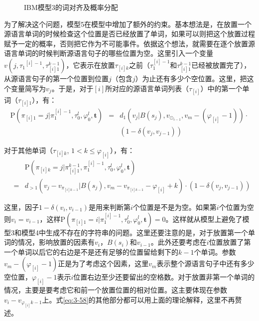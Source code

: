 \begin{figure}[htp]
    \centering

    \caption{IBM模型3的词对齐及概率分配}
    \label{fig:3-33}
\end{figure}

\parinterval 为了解决这个问题，模型5在模型中增加了额外的约束。基本想法是，在放置一个源语言单词的时候检查这个位置是否已经放置了单词，如果可以则把这个放置过程赋予一定的概率，否则把它作为不可能事件。依据这个想法，就需要在逐个放置源语言单词的时候判断源语言句子的哪些位置为空。这里引入一个变量$v(j, {\tau_1}^{[i]-1}, \tau_{[i]1}^{k-1})$，它表示在放置$\tau_{[i]k}$之前（$\tau_1^{[i]-1}$和$\tau_{[i]1}^{k-1}$已经被放置完了），从源语言句子的第一个位置到位置$j$（包含$j$）为止还有多少个空位置。这里，把这个变量简写为$v_j$。于是，对于$[i]$所对应的源语言单词列表（$\tau_{[i]}$）中的第一个单词（$\tau_{[i]1}$），有：
\begin{eqnarray}
\textrm{P}(\pi_{[i]1} = j | \pi_1^{[i]-1}, \tau_0^l, \varphi_0^l, \mathbf{t}) & = & d_1(v_j|B(s_j), v_{\odot_{i-1}}, v_m-(\varphi_{[i]}-1)) \cdot \nonumber \\
                                                                                                   &     & (1-\delta(v_j,v_{j-1}))
\label{eq:3-57}
\end{eqnarray}

\parinterval 对于其他单词（$\tau_{[i]k}$, $1 < k\le\varphi_{[i]}$），有：
\begin{eqnarray}
&   & \textrm{P}(\pi_{[i]k}=j|\pi_{[i]1}^{k-1}, \pi_1^{[i]-1}, \tau_0^l, \varphi_0^l,\mathbf{t}) \nonumber \\
&= & d_{>1}(v_j-v_{\pi_{[i]k-1}}|B(s_j), v_m-v_{\pi_{[i]k-1}}-\varphi_{[i]}+k) \cdot (1-\delta(v_j,v_{j-1}))
\label{eq:3-58}
\end{eqnarray}

\noindent 这里，因子$1-\delta(v_i, v_{i-1})$是用来判断第$i$个位置是不是为空。如果第$i$个位置为空则$v_i = v_{i-1}$，这样$\textrm{P}(\pi_{[i]1}=i|\pi_1^{[i]-1}, \tau_0^l, \varphi_0^l, \mathbf{t}) = 0$。这样就从模型上避免了模型3和模型4中生成不存在的字符串的问题。这里还要注意的是，对于放置第一个单词的情况，影响放置的因素有$v_i$，$B(s_i)$和$v_{i-1}$。此外还要考虑在$i$位置放置了第一个单词以后它的右边是不是还有足够的位置留给剩下的$k-1$个单词。参数$v_m-(\varphi_{[i]}-1)$正是为了考虑这个因素，这里$v_m$表示整个源语言句子中还有多少空位置，$\varphi_{[i]}-1$表示$i$位置右边至少还要留出的空格数。对于放置非第一个单词的情况，主要是要考虑它和前一个放置位置的相对位置。这主要体现在参数$v_i-v_{\varphi_{[i]}k-1}$上。式\ref{eq:3-58}的其他部分都可以用上面的理论解释，这里不再赘述。

